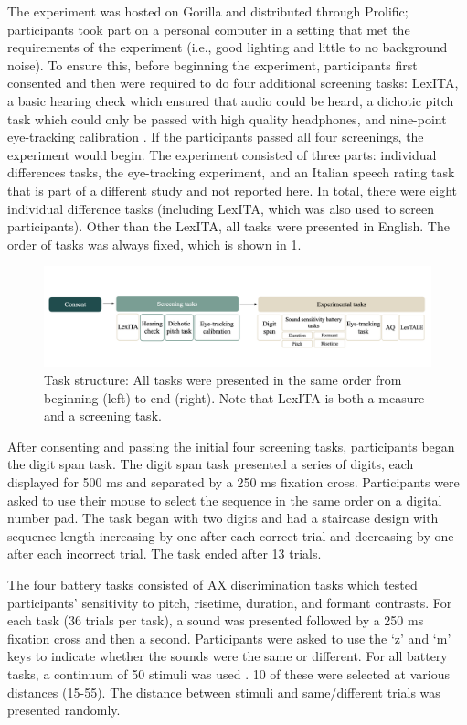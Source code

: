 The experiment was hosted on Gorilla and distributed through Prolific; participants took part on a personal computer in a setting that met the requirements of the experiment (i.e., good lighting and little to no background noise). To ensure this, before beginning the experiment, participants first consented and then were required to do four additional screening tasks: LexITA, a basic hearing check which ensured that audio could be heard, a dichotic pitch task \citep{milne_2021} which could only be passed with high quality headphones, and nine-point eye-tracking calibration \citep{bramlett_wiener_24-AOW}. If the participants passed all four screenings, the experiment would begin. The experiment consisted of three parts: individual differences tasks, the eye-tracking experiment, and an Italian speech rating task that is part of a different study and not reported here. In total, there were eight individual difference tasks (including LexITA, which was also used to screen participants). Other than the LexITA, all tasks were presented in English. The order of tasks was always fixed, which is shown in \ref{fig:task_structure}. 

\begin{figure}[H]
  \centering
  \includegraphics[width=1\linewidth]{visuals/task_structure.jpg}
  \caption{Task structure: All tasks were presented in the same order from beginning (left) to end (right). Note that LexITA is both a measure and a screening task.}
  \label{fig:task_structure}
\end{figure}

After consenting and passing the initial four screening tasks, participants began the digit span task. The digit span task presented a series of digits, each displayed for 500 ms and separated by a 250 ms fixation cross. Participants were asked to use their mouse to select the sequence in the same order on a digital number pad. The task began with two digits and had a staircase design with sequence length increasing by one after each correct trial and decreasing by one after each incorrect trial. The task ended after 13 trials. 

The four battery tasks consisted of AX discrimination tasks which tested participants' sensitivity to pitch, risetime, duration, and formant contrasts. For each task (36 trials per task), a sound was presented followed by a 250 ms fixation cross and then a second. Participants were asked to use the `z' and `m' keys to indicate whether the sounds were the same or different. For all battery tasks, a continuum of 50 stimuli was used \citep{Kachlicka_Saito_Tierney_2019}. 10 of these were selected at various distances (15-55). The distance between stimuli and same/different trials was presented randomly.


